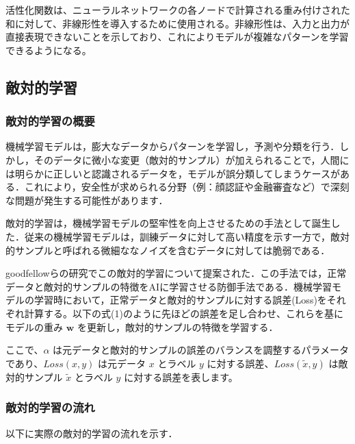 活性化関数は、ニューラルネットワークの各ノードで計算される重み付けされた和に対して、非線形性を導入するために使用される。非線形性は、入力と出力が直接表現できないことを示しており、これによりモデルが複雑なパターンを学習できるようになる。\cite{book-deeplearning}

\subsection{敵対的学習}
\subsubsection{敵対的学習の概要}
機械学習モデルは，膨大なデータからパターンを学習し，予測や分類を行う．しかし，そのデータに微小な変更（敵対的サンプル）が加えられることで，人間には明らかに正しいと認識されるデータを，モデルが誤分類してしまうケースがある．これにより，安全性が求められる分野（例：顔認証や金融審査など）で深刻な問題が発生する可能性があります．

敵対的学習は，機械学習モデルの堅牢性を向上させるための手法として誕生した．従来の機械学習モデルは，訓練データに対して高い精度を示す一方で，敵対的サンプルと呼ばれる微細ななノイズを含むデータに対しては脆弱である．

goodfellowらの研究\cite{goodfellow2015explaining}でこの敵対的学習について提案された．この手法では，正常データと敵対的サンプルの特徴をAIに学習させる防御手法である．機械学習モデルの学習時において，正常データと敵対的サンプルに対する誤差(Loss)をそれぞれ計算する。以下の式(1)のように先ほどの誤差を足し合わせ、これらを基にモデルの重み $\bm{w}$ を更新し，敵対的サンプルの特徴を学習する．


ここで、$\alpha$ は元データと敵対的サンプルの誤差のバランスを調整するパラメータであり、$Loss(x,y)$ は元データ $x$ とラベル $y$ に対する誤差、$Loss(\tilde{x},y)$ は敵対的サンプル $\tilde{x}$ とラベル $y$ に対する誤差を表します。

\subsubsection{敵対的学習の流れ}
以下に実際の敵対的学習の流れを示す．\cite{MBSD-AdversarialTraining}

